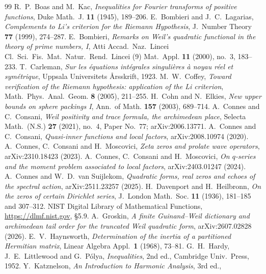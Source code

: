 \documentclass[11pt]{amsart}
\theoremstyle{definition}
\theoremstyle{remark}
\begin{document}
\begin{thebibliography}{99}
 R.~P.~Boas and M.~Kac, \emph{Inequalities for Fourier transforms of positive
functions}, Duke Math.~J. \textbf{11} (1945), 189--206.
 E.~Bombieri and J.~C.~Lagarias, \emph{Complements to Li's criterion
for the Riemann Hypothesis}, J.~Number Theory \textbf{77} (1999), 274--287.
 E.~Bombieri, \emph{Remarks on Weil's quadratic functional in the theory of
prime numbers, I}, Atti Accad.~Naz.~Lincei Cl.~Sci.~Fis.~Mat.~Natur.~Rend.~Lincei (9) Mat.~Appl.
\textbf{11} (2000), no.~3, 183--233.
 T.~Carleman, \emph{Sur les \'equations int\'egrales singuli\`eres \`a noyau r\'eel et sym\'etrique}, Uppsala Universitets \AA rsskrift, 1923.
 M.~W.~Coffey, \emph{Toward verification of the Riemann hypothesis:
application of the Li criterion}, Math.~Phys.~Anal.~Geom. \textbf{8} (2005), 211--255.
 H.~Cohn and N.~Elkies, \emph{New upper bounds on sphere packings I},
Ann.~of Math. \textbf{157} (2003), 689--714.
 A.~Connes and C.~Consani, \emph{Weil positivity and trace formula, the archimedean place}, Selecta Math.\ (N.S.) \textbf{27} (2021), no.~4, Paper No.~77; arXiv:2006.13771.
 A.~Connes and C.~Consani, \emph{Quasi-inner functions and local factors}, arXiv:2008.10974 (2020).
 A.~Connes, C.~Consani and H.~Moscovici, \emph{Zeta zeros and prolate wave operators}, arXiv:2310.18423 (2023).
 A.~Connes, C.~Consani and H.~Moscovici, \emph{On $q$-series and the moment problem associated to local factors}, arXiv:2403.01247 (2024).
 A.~Connes and W.~D.~van Suijlekom, \emph{Quadratic forms, real zeros and echoes of the spectral action}, arXiv:2511.23257 (2025).
 H.~Davenport and H.~Heilbronn, \emph{On the zeros of certain
Dirichlet series}, J.~London Math.~Soc. \textbf{11} (1936), 181--185 and 307--312.
 NIST Digital Library of Mathematical Functions, \url{https://dlmf.nist.gov}, \S5.9.
 A.~Groskin, \emph{A finite Guinand--Weil dictionary and archimedean tail
order for the truncated Weil quadratic form}, arXiv:2607.02828 (2026).
 E.~V.~Haynsworth, \emph{Determination of the inertia of a partitioned Hermitian
matrix}, Linear Algebra Appl.\ \textbf{1} (1968), 73--81.
 G.~H.~Hardy, J.~E.~Littlewood and G.~P\'olya, \emph{Inequalities}, 2nd ed., Cambridge Univ.~Press, 1952.
 Y.~Katznelson, \emph{An Introduction to Harmonic Analysis}, 3rd ed.,

\end{thebibliography}
\end{document}
